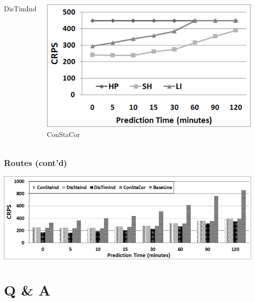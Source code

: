 \documentclass[t]{beamer}
\begin{document}
\begin{frame}
\begin{columns}
\begin{center}
			DisTimInd
		\end{center}
		\begin{center}
			\includegraphics[scale=0.3]{Approaches_ConStaCor.png}\\
			ConStaCor
		\end{center}
\end{columns}
\end{frame}

\begin{frame}\frametitle{Routes \small{(cont'd)}}
\vspace{0.5in}
\begin{center}
	\includegraphics[scale=0.3]{Approaches_All.png}
\end{center}
\end{frame}


\section{Q \& A}
\end{document}
